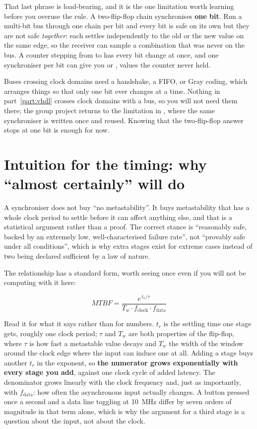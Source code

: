 \begin{warning}
That last phrase is load-bearing, and it is the one limitation worth learning before you overuse
the rule. A two-flip-flop chain synchronises \textbf{one bit}. Run a multi-bit bus through one
chain per bit and every bit is safe on its own but they are not safe \emph{together}: each settles
independently to the old or the new value on the same edge, so the receiver can sample a
combination that was never on the bus. A counter stepping from  to  has every
bit change at once, and one synchroniser per bit can give you  or , values
the counter never held.

Buses crossing clock domains need a handshake, a FIFO, or Gray coding, which arranges things so
that only one bit ever changes at a time. Nothing in part~\ref{part:vhdl} crosses clock domains with
a bus, so you will not need them there; the group project returns to the limitation in
, where the same synchroniser is written once and reused. Knowing that the
two-flip-flop answer stops at one bit is enough for now.
\end{warning}

\section{Intuition for the timing: why ``almost certainly'' will do}
\label{c4:sec:mtbf}

A synchroniser does not buy ``no metastability''. It buys metastability that has a whole clock
period to settle before it can affect anything else, and that is a statistical argument rather than
a proof. The correct stance is ``reasonably safe, backed by an extremely low, well-characterised
failure rate'', not ``provably safe under all conditions'', which is why extra stages exist for
extreme cases instead of two being declared sufficient by a law of nature.

The relationship has a standard form, worth seeing once even if you will not be computing with it
here:

\[ \mathit{MTBF} = \frac{e^{\,t_r / \tau}}{T_w \cdot f_{\mathrm{clock}} \cdot f_{\mathrm{data}}} \]

Read it for what it says rather than for numbers. $t_r$ is the settling time one stage gets, roughly
one clock period; $\tau$ and $T_w$ are both properties of the flip-flop, where $\tau$ is how fast a
metastable value decays and $T_w$ the width of the window around the clock edge where the input can
induce one at all. Adding a stage buys another $t_r$ in the exponent, so \textbf{the numerator grows
exponentially with every stage you add}, against one clock cycle of added latency. The denominator
grows linearly with the clock frequency and, just as importantly, with $f_{\mathrm{data}}$: how
often the asynchronous input actually changes. A button pressed once a second and a data line
toggling at 10~MHz differ by seven orders of magnitude in that term alone, which is why the argument
for a third stage is a question about the input, not about the clock.

